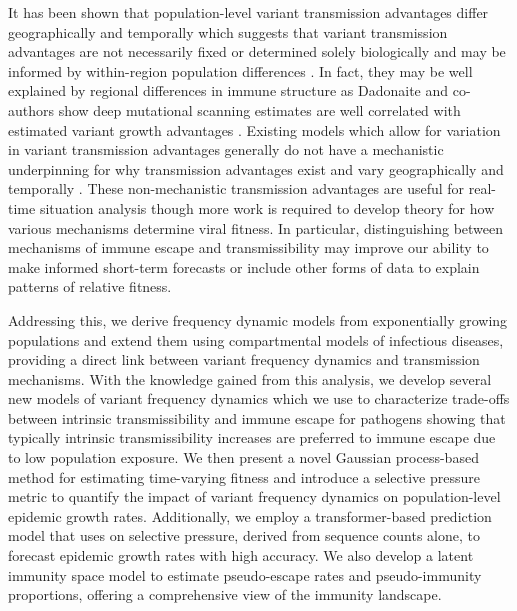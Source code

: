 \documentclass[12pt,oneside,letterpaper]{article}
\begin{document}
It has been shown that population-level variant transmission advantages differ geographically and temporally which suggests that variant transmission advantages are not necessarily fixed or determined solely biologically and may be informed by within-region population differences \cite{figgins2022sars, vanDorp2022}.
In fact, they may be well explained by regional differences in immune structure as Dadonaite and co-authors show deep mutational scanning estimates are well correlated with estimated variant growth advantages \cite{Dadonaite2023}.
Existing models which allow for variation in variant transmission advantages generally do not have a mechanistic underpinning for why transmission advantages exist and vary geographically and temporally \cite{figgins2022sars, susswein2023leveraging}.
These non-mechanistic transmission advantages are useful for real-time situation analysis though more work is required to develop theory for how various mechanisms determine viral fitness.
In particular, distinguishing between mechanisms of immune escape and transmissibility may improve our ability to make informed short-term forecasts or include other forms of data to explain patterns of relative fitness.


Addressing this, we derive frequency dynamic models from exponentially growing populations and extend them using compartmental models of infectious diseases, providing a direct link between variant frequency dynamics and transmission mechanisms.
With the knowledge gained from this analysis, we develop several new models of variant frequency dynamics which we use to characterize trade-offs between intrinsic transmissibility and immune escape for pathogens showing that typically intrinsic transmissibility increases are preferred to immune escape due to low population exposure.
We then present a novel Gaussian process-based method for estimating time-varying fitness and introduce a selective pressure metric to quantify the impact of variant frequency dynamics on population-level epidemic growth rates.
Additionally, we employ a transformer-based prediction model that uses on selective pressure, derived from sequence counts alone, to forecast epidemic growth rates with high accuracy.
We also develop a latent immunity space model to estimate pseudo-escape rates and pseudo-immunity proportions, offering a comprehensive view of the immunity landscape.
\end{document}
